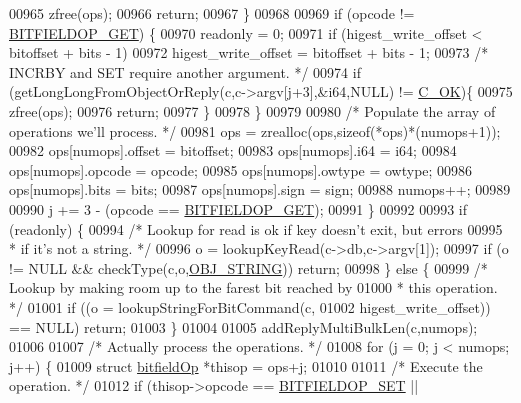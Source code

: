 \begin{DoxyCode}
{00965             zfree(ops);
00966             \textcolor{keywordflow}{return};
00967         \}
00968 
00969         \textcolor{keywordflow}{if} (opcode != \hyperlink{bitops_8c_abb0e64d988f71e146be3778564d90e5f}{BITFIELDOP\_GET}) \{
00970             readonly = 0;
00971             \textcolor{keywordflow}{if} (higest\_write\_offset < bitoffset + bits - 1)
00972                 higest\_write\_offset = bitoffset + bits - 1;
00973             \textcolor{comment}{/* INCRBY and SET require another argument. */}
00974             \textcolor{keywordflow}{if} (getLongLongFromObjectOrReply(c,c->argv[j+3],&i64,NULL) != 
      \hyperlink{server_8h_a303769ef1065076e68731584e758d3e1}{C\_OK})\{
00975                 zfree(ops);
00976                 \textcolor{keywordflow}{return};
00977             \}
00978         \}
00979 
00980         \textcolor{comment}{/* Populate the array of operations we'll process. */}
00981         ops = zrealloc(ops,\textcolor{keyword}{sizeof}(*ops)*(numops+1));
00982         ops[numops].offset = bitoffset;
00983         ops[numops].i64 = i64;
00984         ops[numops].opcode = opcode;
00985         ops[numops].owtype = owtype;
00986         ops[numops].bits = bits;
00987         ops[numops].sign = sign;
00988         numops++;
00989 
00990         j += 3 - (opcode == \hyperlink{bitops_8c_abb0e64d988f71e146be3778564d90e5f}{BITFIELDOP\_GET});
00991     \}
00992 
00993     \textcolor{keywordflow}{if} (readonly) \{
00994         \textcolor{comment}{/* Lookup for read is ok if key doesn't exit, but errors}
00995 \textcolor{comment}{         * if it's not a string. */}
00996         o = lookupKeyRead(c->db,c->argv[1]);
00997         \textcolor{keywordflow}{if} (o != NULL && checkType(c,o,\hyperlink{server_8h_a65236ea160f69cdef33ec942092af88f}{OBJ\_STRING})) \textcolor{keywordflow}{return};
00998     \} \textcolor{keywordflow}{else} \{
00999         \textcolor{comment}{/* Lookup by making room up to the farest bit reached by}
01000 \textcolor{comment}{         * this operation. */}
01001         \textcolor{keywordflow}{if} ((o = lookupStringForBitCommand(c,
01002             higest\_write\_offset)) == NULL) \textcolor{keywordflow}{return};
01003     \}
01004 
01005     addReplyMultiBulkLen(c,numops);
01006 
01007     \textcolor{comment}{/* Actually process the operations. */}
01008     \textcolor{keywordflow}{for} (j = 0; j < numops; j++) \{
01009         \textcolor{keyword}{struct} \hyperlink{structbitfieldOp}{bitfieldOp} *thisop = ops+j;
01010 
01011         \textcolor{comment}{/* Execute the operation. */}
01012         \textcolor{keywordflow}{if} (thisop->opcode == \hyperlink{bitops_8c_a00d14d842300bc8ec501a5e1996c515f}{BITFIELDOP\_SET} ||
}
\end{DoxyCode}
